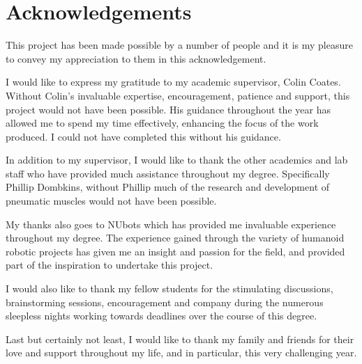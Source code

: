 \section*{Acknowledgements}
\raggedright\hfill\break

This project has been made possible by a number of people and it is my pleasure to convey my appreciation to them in this acknowledgement.\newline

I would like to express my gratitude to my academic supervisor, Colin Coates. Without Colin's invaluable expertise, encouragement, patience and support, this project would not have been possible. His guidance throughout the year has allowed me to spend my time effectively, enhancing the focus of the work produced. I could not have completed this without his guidance.\newline

In addition to my supervisor, I would like to thank the other academics and lab staff who have provided much assistance throughout my degree. Specifically Phillip Dombkins, without Phillip much of the research and development of pneumatic muscles would not have been possible.\newline

My thanks also goes to NUbots which has provided me invaluable experience
throughout my degree. The experience gained through the variety of humanoid robotic projects has given me an insight and passion for the field, and provided part of the inspiration to undertake this project.\newline

I would also like to thank my fellow students for the stimulating discussions, brainstorming
sessions, encouragement and company during the numerous sleepless nights working towards
deadlines over the course of this degree.\newline

Last but certainly not least, I would like to thank my family and friends for their love and
support throughout my life, and in particular, this very challenging year.
